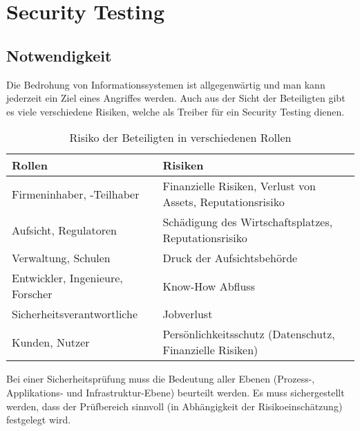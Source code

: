 \section{Security Testing}

\subsection{Notwendigkeit}
Die Bedrohung von Informationssystemen ist allgegenwärtig und man kann jederzeit ein Ziel eines Angriffes werden. Auch aus der Sicht der Beteiligten gibt es viele verschiedene Risiken, welche als Treiber für ein Security Testing dienen.
\begin{table}[H]
	\begin{tabularx}{\textwidth}{l|X}
		\textbf{Rollen} & \textbf{Risiken}\\ \hline
		Firmeninhaber, -Teilhaber & Finanzielle Risiken, Verlust von Assets, Reputationsrisiko\\ \hline
		Aufsicht, Regulatoren & Schädigung des Wirtschaftsplatzes, Reputationsrisiko\\ \hline
		Verwaltung, Schulen & Druck der Aufsichtsbehörde\\ \hline
		Entwickler, Ingenieure, Forscher & Know-How Abfluss\\ \hline
		Sicherheitsverantwortliche & Jobverlust\\ \hline
		Kunden, Nutzer & Persönlichkeitsschutz (Datenschutz, Finanzielle Risiken)\\ \hline
	\end{tabularx}
	\caption{Risiko der Beteiligten in verschiedenen Rollen}
\end{table}

Bei einer Sicherheitsprüfung muss die Bedeutung aller Ebenen (Prozess-, Applikations- und Infrastruktur-Ebene) beurteilt werden. Es muss sichergestellt werden, dass der Prüfbereich sinnvoll (in Abhängigkeit der Risikoeinschätzung) festgelegt wird.

